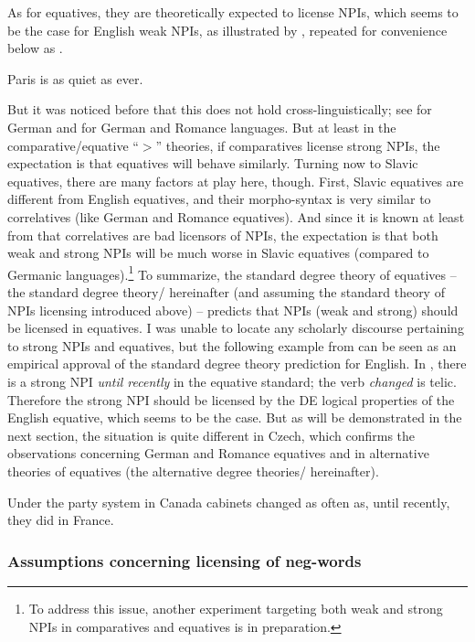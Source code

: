 \documentclass[output=paper,colorlinks,citecolor=brown]{langscibook}
\begin{document}
\noindent As for equatives, they are theoretically expected to license NPIs, which seems to be the case for English weak NPIs, as illustrated by , repeated for convenience below as . 

\ea\label{ex-5-rep} Paris is as quiet as ever.
\z

\noindent But it was noticed before that this does not hold cross-linguistically; see \citet{krifka1992some} for German and \citet{penka2016degree} for German and Romance languages. But at least in the comparative/equative ``$>$'' theories, if comparatives license strong NPIs, the expectation is that equatives will behave similarly. Turning now to Slavic equatives, there are many factors at play here, though. First, Slavic equatives are different from English equatives, and their morpho-syntax is very similar to correlatives (like German and Romance equatives). And since it is known at least from \citet {pauline1995quantificational} that correlatives are bad licensors of NPIs, the expectation is that both weak and strong NPIs will be much worse in Slavic equatives (compared to Germanic languages).\footnote{To address this issue, another experiment targeting both weak and strong NPIs in comparatives and equatives is in preparation.} To summarize, the standard degree theory of equatives -- the standard degree theory/\citet{rullmann1995maximality} hereinafter (and assuming the standard theory of NPIs licensing introduced above) -- predicts that NPIs (weak and strong) should be licensed in equatives. I was unable to locate any scholarly discourse pertaining to strong NPIs and equatives, but the following example  from \citet{britannica} can be seen as an empirical approval of the standard degree theory prediction for English. In , there is a strong NPI \textit{until recently} in the equative standard; the verb \textit{changed} is telic. Therefore the strong NPI should be licensed by the DE logical properties of the English equative, which seems to be the case. But as will be demonstrated in the next section, the situation is quite different in Czech, which confirms the observations concerning German and Romance equatives \citep{krifka1992some,penka2016degree} and in alternative theories of equatives (the alternative degree theories/\cite{penka2016degree} hereinafter).

\ea\label{ex-5-eq} Under the party system in Canada cabinets changed as often as, until recently, they did in France.
\z

\subsubsection{Assumptions concerning licensing of neg-words}\label{sec:assumptions-licensing-of-neg-words}
\end{document}
